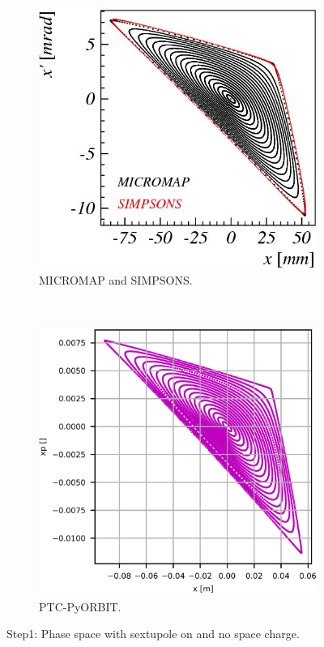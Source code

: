 \documentclass[a4paper]{cernatsnote}
\begin{document}
\begin{figure}
        \centering
        \begin{subfigure}{.5\textwidth}
          \centering
          \includegraphics[width=\textwidth]{Step1_phase-space.png}
          \caption{MICROMAP and SIMPSONS.}
          \label{fig:step1_m}
        \end{subfigure}~~~~~~
        \begin{subfigure}{.5\textwidth}
          \centering
          \includegraphics[width=\textwidth]{Step1_phase-space_PO.png}
          \caption{PTC-PyORBIT.}
          \label{fig:step1_po}
        \end{subfigure}
        \caption{Step1: Phase space with sextupole on and no space charge.}
        \label{fig:step1}
\end{figure}
\end{document}
